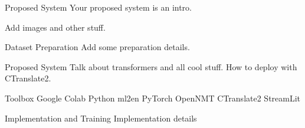 \begin{chapter}{Proposed System}
    Your proposed system is an intro.

    Add images and other stuff.

    \begin{section}{Dataset Preparation}
    Add some preparation details.
    \end{section}

    \begin{section}{Proposed System}
    Talk about transformers and all cool stuff. How to deploy with CTranslate2.
    \end{section}

    \begin{section}{Toolbox}
    Google Colab
    Python
    ml2en
    PyTorch
    OpenNMT
    CTranslate2
    StreamLit
    \end{section}

    \begin{section}{Implementation and Training} 
        Implementation details
    \end{section}
\end{chapter}